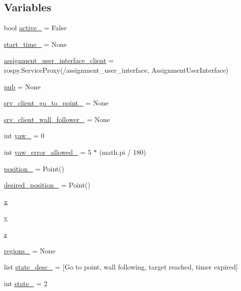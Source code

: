 \subsection*{Variables}
\begin{DoxyCompactItemize}
\item 
bool \hyperlink{namespaceassignment__bug__m_ac2f46e5bcf923cb96387041a0a56c645}{active\+\_\+} = False
\item 
\hyperlink{namespaceassignment__bug__m_a3f2cbd1887f7843f32fa76f089567795}{start\+\_\+time\+\_\+} = None
\item 
\hyperlink{namespaceassignment__bug__m_aa27a620a98a687c953ab4f6645d5d59c}{assignment\+\_\+user\+\_\+interface\+\_\+client} = rospy.\+Service\+Proxy(\textquotesingle{}/assignment\+\_\+user\+\_\+interface\textquotesingle{}, Assignment\+User\+Interface)
\item 
\hyperlink{namespaceassignment__bug__m_a13b5f431efdf1919d899550b61131a3c}{pub} = None
\item 
\hyperlink{namespaceassignment__bug__m_a4c470aefd9a2f667e787de8829811d28}{srv\+\_\+client\+\_\+go\+\_\+to\+\_\+point\+\_\+} = None
\item 
\hyperlink{namespaceassignment__bug__m_a4d22f21b5adbf26d3f5f02318dd9fa3d}{srv\+\_\+client\+\_\+wall\+\_\+follower\+\_\+} = None
\item 
int \hyperlink{namespaceassignment__bug__m_a5471ee746a859bf9cd803018ee360113}{yaw\+\_\+} = 0
\item 
int \hyperlink{namespaceassignment__bug__m_a43c9c3a89b75b7b3397b872fabf2f6f6}{yaw\+\_\+error\+\_\+allowed\+\_\+} = 5 $\ast$ (math.\+pi / 180)
\item 
\hyperlink{namespaceassignment__bug__m_a816b933f822b6c4276424f950631bfdc}{position\+\_\+} = Point()
\item 
\hyperlink{namespaceassignment__bug__m_a0f9fae48bd10c19cdd214c396aa07322}{desired\+\_\+position\+\_\+} = Point()
\item 
\hyperlink{namespaceassignment__bug__m_a0362a6753095315fd584c87160fbf5ae}{x}
\item 
\hyperlink{namespaceassignment__bug__m_a7211c256cf5c4b5a31175d2e032e99d9}{y}
\item 
\hyperlink{namespaceassignment__bug__m_a7851458fa51f34d801ccbc8df90cf3c5}{z}
\item 
\hyperlink{namespaceassignment__bug__m_ac0d497fde4fce5d2323ab75d3351b503}{regions\+\_\+} = None
\item 
list \hyperlink{namespaceassignment__bug__m_a03c40af9fc8235737f6a11586237329d}{state\+\_\+desc\+\_\+} = \mbox{[}\textquotesingle{}Go to point\textquotesingle{}, \textquotesingle{}wall following\textquotesingle{}, \textquotesingle{}target reached\textquotesingle{}, \textquotesingle{}timer expired\textquotesingle{}\mbox{]}
\item 
int \hyperlink{namespaceassignment__bug__m_af631af3438fabcb2b5c436de8764adaa}{state\+\_\+} = 2
\end{DoxyCompactItemize}


